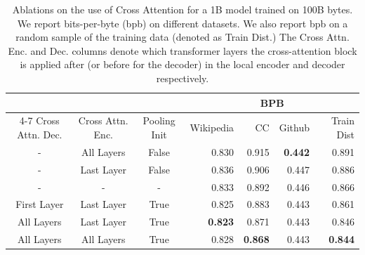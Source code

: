 \begin{table}[t]
\centering
\begin{tabular}{@{}cccrrrr@{}}
\toprule
 &  & &  \multicolumn{4}{c}{BPB}  \\
 \cmidrule(lr){4-7} 
Cross Attn. Dec. & Cross Attn. Enc. & Pooling Init &  Wikipedia &    CC &  Github &  Train Dist \\
\midrule
               - &       All Layers &        False &      0.830 & 0.915 &   \textbf{0.442} &       0.891 \\
               - &       Last Layer &        False &      0.836 & 0.906 &   0.447 &       0.886 \\
               - &                - &            - &      0.833 & 0.892 &   0.446 &       0.866 \\
     First Layer &       Last Layer &         True &      0.825 & 0.883 &   0.443 &       0.861 \\
      All Layers &       Last Layer &         True &      \textbf{0.823} & 0.871 &   0.443 &       0.846 \\
      All Layers &       All Layers &         True &      0.828 & \textbf{0.868} &   0.443 &       \textbf{0.844} \\
\bottomrule
\end{tabular}
\caption{Ablations on the use of Cross Attention for a 1B \model{} model trained on 100B bytes. We report bits-per-byte (bpb) on different datasets. We also report bpb on a random sample of the training data (denoted as Train Dist.) The Cross Attn. Enc. and Dec. columns denote which transformer layers the cross-attention block is applied after (or before for the decoder) in the local encoder and decoder respectively.
}
\label{tab:crossattn_ablations_1b}
\end{table}